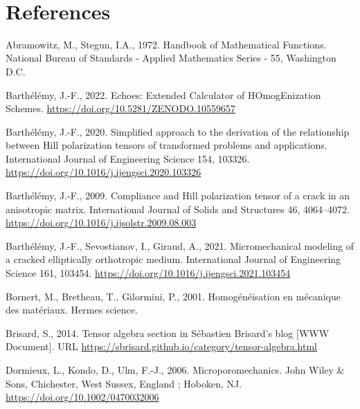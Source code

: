 \documentclass[
  a4paper,
  numbers=noendperiod,
  DIV=12]{scrreprt}
\newlength{\cslhangindent}
\newenvironment{CSLReferences}[2] %
 {\begin{list}{}{%
  \setlength{\itemindent}{0pt}
  \setlength{\leftmargin}{0pt}
  \setlength{\parsep}{0pt}
  \ifodd #1
   \setlength{\leftmargin}{\cslhangindent}
   \setlength{\itemindent}{-1\cslhangindent}
  \fi
  \setlength{\itemsep}{#2\baselineskip}}}
 {\end{list}}
\begin{document}
\(\,\)


\chapter*{References}\label{references}


\label{refs}
\begin{CSLReferences}{1}{0}
Abramowitz, M., Stegun, I.A., 1972. Handbook of {Mathematical
Functions}. National Bureau of Standards - Applied Mathematics Series -
55, Washington D.C.

Barthélémy, J.-F., 2022. Echoes: {Extended Calculator} of
{HOmogEnization Schemes}. \url{https://doi.org/10.5281/ZENODO.10559657}

Barthélémy, J.-F., 2020. Simplified approach to the derivation of the
relationship between {Hill} polarization tensors of transformed problems
and applications. International Journal of Engineering Science 154,
103326. \url{https://doi.org/10.1016/j.ijengsci.2020.103326}

Barthélémy, J.-F., 2009. Compliance and {Hill} polarization tensor of a
crack in an anisotropic matrix. International Journal of Solids and
Structures 46, 4064--4072.
\url{https://doi.org/10.1016/j.ijsolstr.2009.08.003}

Barthélémy, J.-F., Sevostianov, I., Giraud, A., 2021. Micromechanical
modeling of a cracked elliptically orthotropic medium. International
Journal of Engineering Science 161, 103454.
\url{https://doi.org/10.1016/j.ijengsci.2021.103454}

Bornert, M., Bretheau, T., Gilormini, P., 2001. Homogénéisation en
mécanique des matériaux. Hermes science.

Brisard, S., 2014. Tensor algebra section in {Sébastien Brisard}'s blog
{[}WWW Document{]}. URL
\url{https://sbrisard.github.io/category/tensor-algebra.html}

Dormieux, L., Kondo, D., Ulm, F.-J., 2006. Microporomechanics. John
Wiley \& Sons, Chichester, West Sussex, England ; Hoboken, NJ.
\url{https://doi.org/10.1002/0470032006}


\end{CSLReferences}
\end{document}
